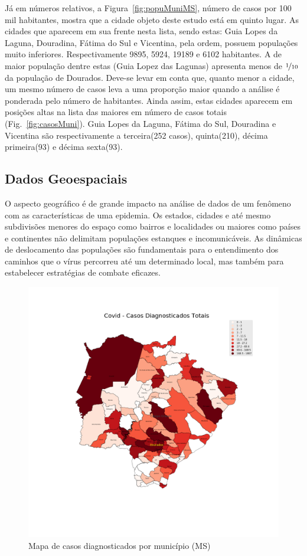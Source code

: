 \documentclass[12pt]{article}
\begin{document}
Já em números relativos, a Figura~\ref{fig:popuMuniMS}, número de casos por 100 mil habitantes, mostra que a cidade objeto deste estudo está em quinto lugar. As cidades que aparecem em sua frente nesta lista, sendo estas: Guia Lopes da Laguna, Douradina, Fátima do Sul e Vicentina, pela ordem, possuem populações muito inferiores. Respectivamente 9895, 5924, 19189 e  6102 habitantes. A de maior população dentre estas (Guia Lopez das Lagunas) apresenta menos de \(\nicefrac{1}{10}\) da população de Dourados. Deve-se levar em conta que, quanto menor a cidade, um mesmo número de casos leva a uma proporção maior quando a análise é ponderada pelo número de habitantes. Ainda assim, estas cidades aparecem em posições altas na lista das maiores em número de casos totais (Fig.~\ref{fig:casosMuni}). Guia Lopes da Laguna, Fátima do Sul, Douradina e Vicentina são respectivamente a terceira(252 casos), quinta(210), décima primeira(93) e décima sexta(93). 

\subsection{Dados Geoespaciais}\label{ssec:geo}

O aspecto geográfico é de grande impacto na análise de dados de um fenômeno com as características de uma epidemia. Os estados, cidades e até mesmo subdivisões menores do espaço como bairros e localidades ou maiores como países e  continentes não delimitam populações estanques e incomunicáveis. As dinâmicas de deslocamento das populações são fundamentais para o entendimento dos caminhos que o vírus percorreu até um determinado local, mas também para estabelecer estratégias de combate eficazes.

\begin{figure}[!htb]
  \centering
  \includegraphics[width=1\textwidth]{figs/mapa_casos_registrados.png}
  \caption{Mapa de casos diagnosticados por município (MS)}
  \label{fig:mapaCasos}
  \end{figure}
\end{document}
